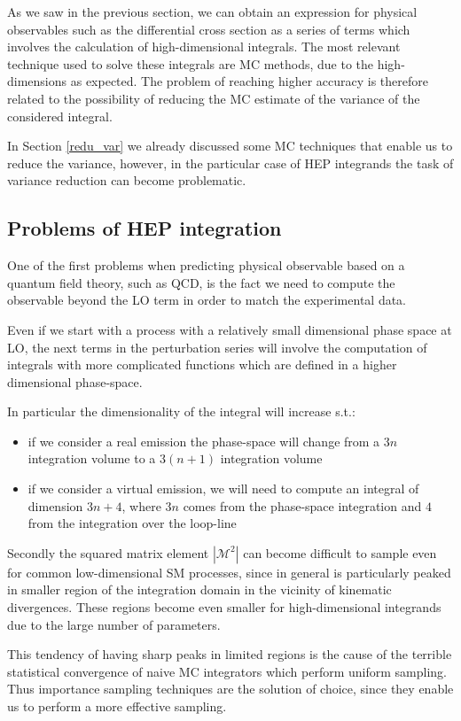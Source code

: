 \documentclass[../main/main.tex]{subfiles}
\begin{document}
As we saw in the previous section, we can obtain an expression for physical observables such as the differential cross section as a series of terms which involves the calculation of high-dimensional integrals. The most relevant technique used to solve these integrals are MC methods, due to the high-dimensions as expected. The problem of reaching higher accuracy is therefore related 
to the possibility of reducing the MC estimate of the variance of the considered integral.

In Section \ref{redu_var} we already discussed some MC techniques that enable us to reduce the variance, however, in the particular case of HEP integrands the task of variance reduction can become problematic.

\subsection{Problems of HEP integration}
One of the first problems when predicting physical observable based on a quantum field theory, such as QCD, is the fact we need to compute the observable beyond the LO term in order to match the experimental data. 

Even if we start with a process with a relatively small dimensional phase space  at LO, the next terms in the perturbation series will involve the computation of integrals with more complicated functions which are defined in a higher dimensional phase-space.

In particular the dimensionality of the integral will increase s.t.:
\begin{itemize}
	\item if we consider a real emission  the phase-space will change from a $3 n$ integration volume to a $3(n+1)$ integration volume
	\item if we consider a virtual emission, we will need to compute an integral of dimension $3n +4$, where $3n$ comes from the phase-space integration and $4$ from the integration over the loop-line
\end{itemize}

Secondly the squared matrix element $|\mathcal{M}^2|$ can become difficult to sample even for common low-dimensional SM processes, since 
in general is particularly peaked in smaller region of the integration domain in the vicinity of kinematic divergences. These regions become even smaller for high-dimensional integrands due to the large number of parameters.

This tendency of having sharp peaks in limited regions is the cause of the terrible statistical convergence of naive MC integrators which 
perform uniform sampling. Thus importance sampling techniques are the solution of choice, since they enable us to perform a more effective 
sampling.
\end{document}
